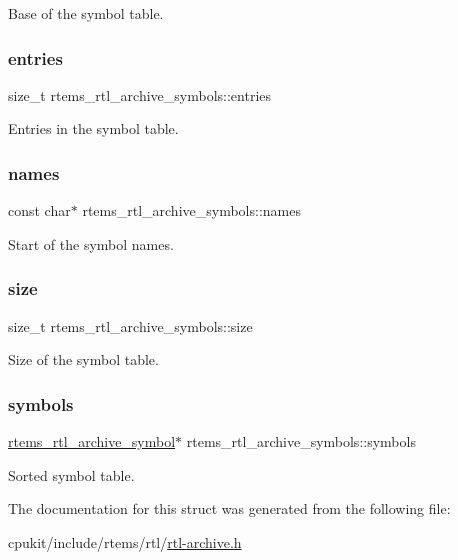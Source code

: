 Base of the symbol table. \mbox{\label{structrtems__rtl__archive__symbols_a6cc69c08a6ead427731ebb63870ae9d7}} 
\subsubsection{\texorpdfstring{entries}{entries}}
{\footnotesize\ttfamily size\+\_\+t rtems\+\_\+rtl\+\_\+archive\+\_\+symbols\+::entries}

Entries in the symbol table. \mbox{\label{structrtems__rtl__archive__symbols_a99325b26679474999306837e96b901fc}} 
\subsubsection{\texorpdfstring{names}{names}}
{\footnotesize\ttfamily const char$\ast$ rtems\+\_\+rtl\+\_\+archive\+\_\+symbols\+::names}

Start of the symbol names. \mbox{\label{structrtems__rtl__archive__symbols_a9ef33c571f02fdff86b315f8ee9398f9}} 
\subsubsection{\texorpdfstring{size}{size}}
{\footnotesize\ttfamily size\+\_\+t rtems\+\_\+rtl\+\_\+archive\+\_\+symbols\+::size}

Size of the symbol table. \mbox{\label{structrtems__rtl__archive__symbols_a284ec035b7cfbffdfa03c3b8aa94df5b}} 
\subsubsection{\texorpdfstring{symbols}{symbols}}
{\footnotesize\ttfamily \mbox{\hyperlink{structrtems__rtl__archive__symbol}{rtems\+\_\+rtl\+\_\+archive\+\_\+symbol}}$\ast$ rtems\+\_\+rtl\+\_\+archive\+\_\+symbols\+::symbols}

Sorted symbol table. 

The documentation for this struct was generated from the following file\+:\begin{DoxyCompactItemize}
\item 
cpukit/include/rtems/rtl/\mbox{\hyperlink{rtl-archive_8h}{rtl-\/archive.\+h}}\end{DoxyCompactItemize}
